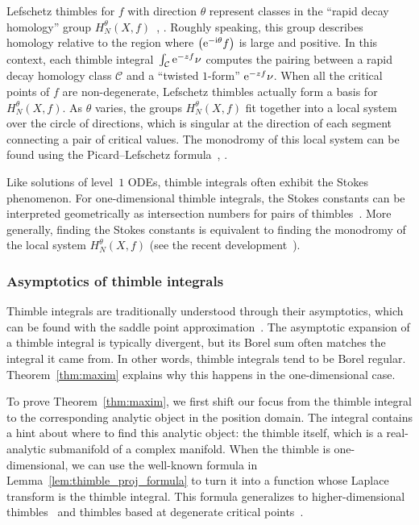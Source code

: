 \documentclass[10pt,a4paper]{amsart}
\let\Re\relax
\DeclareMathOperator{\Re}{Re}
\numberwithin{equation}{section}
\begin{document}
Lefschetz thimbles for $f$ with direction $\theta$ represent classes in the ``rapid decay homology'' group $H^\theta_N(X,f)$~\cite{pham}, \cite[Section~1.1]{fresan-notes}. Roughly speaking, this group describes homology relative to the region where $\Re\bigl({\rm e}^{-{\rm i}\theta} f\bigr)$ is large and positive. In this context, each thimble integral~$\int_{\mathcal{C}}{\rm e}^{-zf} \nu$
computes the pairing between a rapid decay homology class $\mathcal{C}$ and a ``twisted $1$-form'' ${\rm e}^{-zf} \nu$. When all the critical points of $f$ are non-degenerate, Lefschetz thimbles actually form a basis for $H^\theta_N(X,f)$. As $\theta$ varies, the groups $H^\theta_N(X,f)$ fit together into a local system over the circle of directions, which is singular at the direction of each segment connecting a pair of critical values. The monodromy of this local system can be found using the Picard--Lefschetz formula~\cite[Section~1]{Arnold}, \cite[2\`{e}me Partie, Section~3.3]{pham}.

Like solutions of level~$1$ ODEs, thimble integrals often exhibit the Stokes phenomenon. For one-dimensional thimble integrals, the Stokes constants can be interpreted geometrically as intersection numbers for pairs of thimbles~\cite{kontsevich2022analyticity}. More generally, finding the Stokes constants is equivalent to finding the monodromy of the local system $H^\theta_N(X,f)$ (see the recent development~\cite{kontsevich2024holomorphic}).
%
\subsubsection{Asymptotics of thimble integrals}
%
Thimble integrals are traditionally understood through their asymptotics, which can be found with the saddle point approximation~\cite{andersen2020resurgence,delabaere_dillinger_pham,delabaere-howls,Delabaere-Pham99,dingle1973asymptotic,Malgrange22,Pham83}. The asymptotic expansion of a thimble integral is typically divergent, but its Borel sum often matches the integral it came from. In other words, thimble integrals tend to be Borel regular. Theorem~\ref{thm:maxim} explains why this happens in the one-dimensional case.

To prove Theorem~\ref{thm:maxim}, we first shift our focus from the thimble integral to the corresponding analytic object in the position domain. The integral contains a hint about where to find this analytic object: the thimble itself, which is a real-analytic submanifold of a complex manifold. When the thimble is one-dimensional, we can use the well-known formula in Lemma~\ref{lem:thimble_proj_formula} to turn it into a function whose Laplace transform is the thimble integral. This formula generalizes to higher-dimensional thimbles~\cite{pham} and thimbles based at degenerate critical points~\cite[Section~1.2.2]{mistegard_phdthesis}.
%
\end{document}
